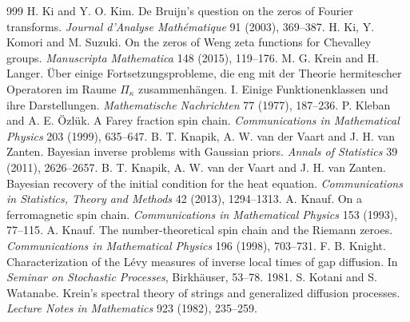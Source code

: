\begin{thebibliography}{999}
 H. Ki and Y. O. Kim. De Bruijn's question on the zeros of Fourier transforms. \emph{Journal d'Analyse Math\'ematique} 91 (2003), 369--387.
 H. Ki, Y. Komori and M. Suzuki. On the zeros of Weng zeta functions for Chevalley groups. \emph{Manuscripta Mathematica} 148 (2015), 119--176.
 M. G. Krein and H. Langer. \"Uber einige Fortsetzungsprobleme, die eng mit der Theorie hermitescher Operatoren im Raume $\Pi_\kappa$ zusammenh\"angen. I. Einige Funktionenklassen und ihre Darstellungen. \emph{Mathematische Nachrichten} 77 (1977), 187--236.
 P. Kleban and A. E. \"Ozl\"uk. A Farey fraction spin chain. \emph{Communications in Mathematical Physics} 203 (1999), 635--647.
 B. T. Knapik, A. W. van der Vaart and J. H. van Zanten. Bayesian inverse problems with Gaussian priors. \emph{Annals of Statistics} 39 (2011), 2626--2657.
 B. T. Knapik, A. W. van der Vaart and J. H. van Zanten. Bayesian recovery of the initial condition for the heat equation. \emph{Communications in Statistics, Theory and Methods} 42 (2013), 1294--1313.
 A. Knauf. On a ferromagnetic spin chain. \emph{Communications in Mathematical Physics} 153 (1993), 77--115.
 A. Knauf. The number-theoretical spin chain and the Riemann zeroes. \emph{Communications in Mathematical Physics} 196 (1998), 703--731.
 F. B. Knight. Characterization of the L\'evy measures of inverse local times of gap diffusion. In \emph{Seminar on Stochastic Processes}, Birkh\"auser, 53--78. 1981.
 S. Kotani and S. Watanabe. Krein's spectral theory of strings and generalized diffusion processes. \emph{Lecture Notes in Mathematics} 923 (1982), 235--259.

\end{thebibliography}
